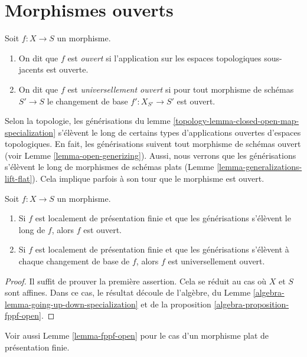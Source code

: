 \section{Morphismes ouverts}
\label{section-open}

\begin{definition}
\label{definition-open}
Soit $f : X \to S$ un morphisme.
\begin{enumerate}
\item On dit que $f$ est {\it ouvert} si l'application sur les espaces
topologiques sous-jacents est ouverte.
\item On dit que $f$ est {\it universellement ouvert} si
pour tout morphisme de schémas $S' \to S$ le changement de base $f' : X_{S'} \to S'$ est ouvert.
\end{enumerate}
\end{definition}

\noindent
Selon la topologie,
les générisations du lemme \ref{topology-lemma-closed-open-map-specialization} s'élèvent le long
de certains types d'applications ouvertes d'espaces topologiques.
En fait, les générisations suivent tout morphisme de schémas ouvert
(voir
Lemme \ref{lemma-open-generizing}). Aussi,
nous verrons que les générisations s'élèvent le long de morphismes
de schémas plats (Lemme \ref{lemma-generalizations-lift-flat}). Cela implique
parfois à son tour que le morphisme est ouvert.

\begin{lemma}
\label{lemma-locally-finite-presentation-universally-open}
Soit $f : X \to S$ un morphisme.
\begin{enumerate}
\item Si $f$ est localement de présentation finie et que les générisations s'élèvent le long de $f$,
alors $f$ est ouvert.
\item Si $f$ est localement de présentation finie et que les générisations s'élèvent à chaque
changement de base de $f$, alors $f$ est universellement ouvert.
\end{enumerate}
\end{lemma}

\begin{proof}
Il suffit de prouver la première assertion.
Cela se réduit au cas où $X$ et
$S$ sont affines. Dans
ce cas, le résultat découle de l'algèbre, du Lemme \ref{algebra-lemma-going-up-down-specialization}
et de la proposition \ref{algebra-proposition-fppf-open}.
\end{proof}

\noindent
Voir aussi Lemme \ref{lemma-fppf-open} pour le cas d'un morphisme plat
de présentation finie.

